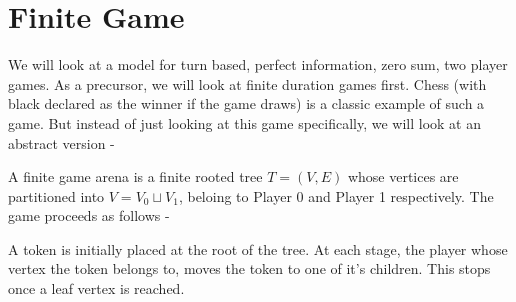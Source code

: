 \chapter{Finite Game}

We will look at a model for turn based, perfect information, zero sum, two player games.
As a precursor, we will look at finite duration games first. Chess (with black declared as the winner if the game draws) is a classic example of such a game. But instead of just looking at this game specifically, we will look at an abstract version -


A finite game arena is a finite rooted tree $T=(V,E)$ whose vertices are partitioned into $V = V_0 \sqcup V_1$, beloing to Player 0 and Player 1 respectively.
The game proceeds as follows -

A token is initially placed at the root of the tree. At each stage, the player whose vertex the token belongs to, moves the token to one of it's children. This stops once a leaf vertex is reached. 
